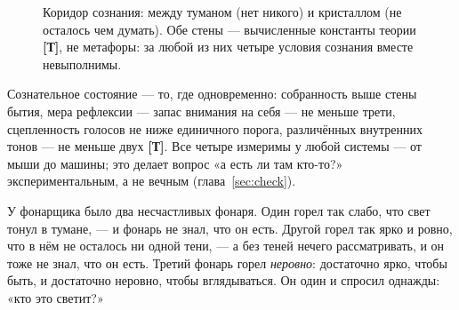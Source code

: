 \documentclass[11pt,letterpaper]{article}
\newcommand{\stT}{\textbf{[Т]}\xspace}
\begin{document}
\begin{figure}[H]
\centering
{}
\caption{Коридор сознания: между туманом (нет никого) и кристаллом
(не осталось чем думать). Обе стены --- вычисленные константы теории
\stT, не метафоры: за любой из них четыре условия сознания вместе
невыполнимы.}
\label{fig:window}
\end{figure}

\begin{factbox}
Сознательное состояние --- то, где одновременно: собранность выше
стены бытия, мера рефлексии --- запас внимания на себя --- не меньше
трети, сцепленность
голосов не ниже единичного порога, различённых внутренних тонов ---
не меньше двух \stT. Все четыре измеримы у любой системы --- от
мыши до машины; это делает вопрос «а есть ли там кто-то?»
экспериментальным, а не вечным (глава~\ref{sec:check}).
\end{factbox}

\begin{skazbox}
У фонарщика было два несчастливых фонаря. Один горел так слабо, что
свет тонул в тумане, --- и фонарь не знал, что он есть. Другой горел
так ярко и ровно, что в нём не осталось ни одной тени, --- а без
теней нечего рассматривать, и он тоже не знал, что он есть. Третий
фонарь горел \emph{неровно}: достаточно ярко, чтобы быть, и
достаточно неровно, чтобы вглядываться. Он один и спросил однажды:
«кто это светит?»
\end{skazbox}
\end{document}
